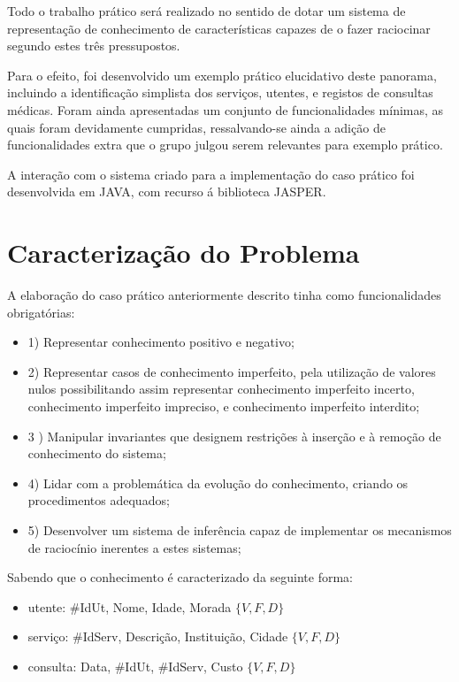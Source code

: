 \documentclass[
  oneside,
  10pt, a4paper,
  footinclude=true,
  headinclude=true,
  cleardoublepage=empty
]{scrbook}
\begin{document}
Todo o trabalho prático será realizado no sentido de dotar um sistema de representação de conhecimento de características capazes de o fazer raciocinar segundo estes três pressupostos.\par 

Para o efeito, foi desenvolvido um exemplo prático elucidativo deste panorama, incluindo a identificação simplista dos serviços, utentes, e registos de consultas médicas. Foram ainda apresentadas um conjunto de funcionalidades mínimas, as quais foram devidamente cumpridas, ressalvando-se ainda a adição de funcionalidades extra que o grupo julgou serem relevantes para exemplo prático.\par 
A interação com o sistema criado para a implementação do caso prático foi desenvolvida em JAVA, com recurso á biblioteca JASPER.


	\chapter{Caracterização do Problema}
	         A elaboração do caso prático anteriormente descrito tinha como funcionalidades obrigatórias:
\begin{itemize}
\item 1) Representar conhecimento positivo e negativo;
\item 2) Representar casos de conhecimento imperfeito, pela utilização de valores nulos possibilitando assim representar conhecimento imperfeito incerto, conhecimento imperfeito impreciso, e conhecimento imperfeito interdito;
\item 3 ) Manipular invariantes que designem restrições à inserção e à remoção de conhecimento do sistema;
\item 4) Lidar com a problemática da evolução do conhecimento, criando os procedimentos adequados;
\item 5) Desenvolver um sistema de inferência capaz de implementar os mecanismos de raciocínio inerentes a estes sistemas;
\end{itemize}
\vspace{1cm}

Sabendo que o conhecimento é caracterizado da seguinte forma:
\begin{itemize}
\item{utente: \#IdUt, Nome, Idade, Morada \rightarrow $\{V,F,D\}$
}

\item{serviço: \#IdServ, Descrição, Instituição, Cidade \rightarrow $\{V,F,D\}$
}

\item consulta: Data, \#IdUt, \#IdServ, Custo \rightarrow $\{V,F,D\}$

\end{itemize}
\vspace{1cm}
\end{document}
